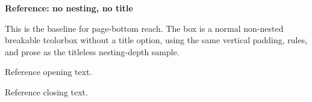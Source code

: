 \documentclass[a4paper,10pt]{article}
\newcommand{\innertext}{%
  \lipsum[1-5]
  \medskip
  \lipsum[6-9]
}
\begin{document}
{\Large\bfseries Reference: no nesting, no title\par}
\medskip
This is the baseline for page-bottom reach. The box is a normal non-nested
breakable tcolorbox without a title option, using the same vertical padding,
rules, and prose as the titleless nesting-depth sample.
\medskip

\begin{referencebox}
Reference opening text.

\innertext

Reference closing text.
\end{referencebox}
\end{document}
